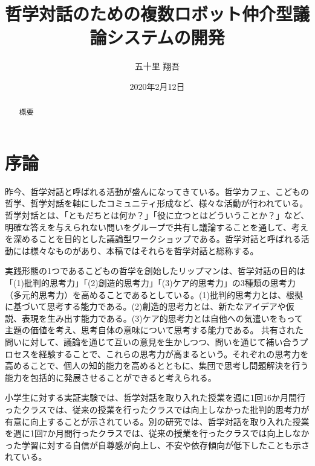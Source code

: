 \documentclass[11pt, a4paper]{jreport} %
\title{哲学対話のための複数ロボット仲介型議論システムの開発}
\author{五十里 翔吾}
\date{2020年2月12日}
\begin{document}
\maketitle

\begin{abstract}
概要
\end{abstract}

\tableofcontents

\chapter{序論}

昨今、哲学対話と呼ばれる活動が盛んになってきている。哲学カフェ\cite{2014哲学カフェのつくりかた}、こどもの哲学\cite{こども哲学おとな哲学アーダコーダ2019こども哲学ハンドブック}、哲学対話を軸にしたコミュニティ形成\cite{weko_15800_1}など、様々な活動が行われている。哲学対話とは、「ともだちとは何か？」「役に立つとはどういうことか？」など、明確な答えを与えられない問いをグループで共有し議論することを通して、考えを深めることを目的とした議論型ワークショップである。哲学対話と呼ばれる活動には様々なものがあり、本稿ではそれらを哲学対話と総称する。%


実践形態の1つであるこどもの哲学を創始したリップマンは、哲学対話の目的は「(1)批判的思考力」「(2)創造的思考力」「(3)ケア的思考力」の3種類の思考力（多元的思考力）を高めることであるとしている\cite{lipman_2003}。(1)批判的思考力とは、根拠に基づいて思考する能力である。(2)創造的思考力とは、新たなアイデアや仮説、表現を生み出す能力である。(3)ケア的思考力とは自他への気遣いをもって主題の価値を考え、思考自体の意味について思考する能力である。
共有された問いに対して、議論を通じて互いの意見を生かしつつ、問いを通じて補い合うプロセスを経験することで、これらの思考力が高まるという。それぞれの思考力を高めることで、個人の知的能力を高めるとともに、集団で思考し問題解決を行う能力を包括的に発展させることができると考えられる。


小学生に対する実証実験では、哲学対話を取り入れた授業を週に1回16か月間行ったクラスでは、従来の授業を行ったクラスでは向上しなかった批判的思考力が有意に向上することが示されている\cite{doi:10.1348/000709906X105328}。別の研究では、哲学対話を取り入れた授業を週に1回7か月間行ったクラスでは、従来の授業を行ったクラスでは向上しなかった学習に対する自信が自尊感が向上し、不安や依存傾向が低下したことも示されている\cite{doi:10.1177/0143034306073417}。
\end{document}
